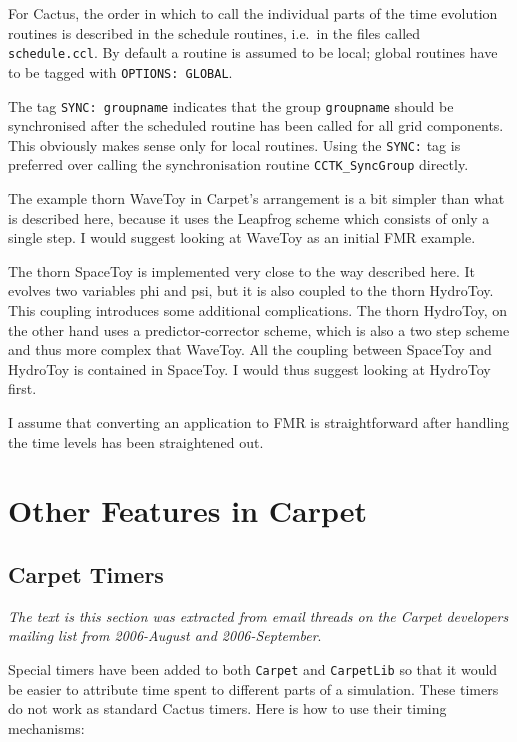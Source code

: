 For Cactus, the order in which to call the individual parts of the
time evolution routines is described in the schedule routines, i.e.\
in the files called \texttt{schedule.ccl}.  By default a routine is
assumed to be local; global routines have to be tagged with
\texttt{OPTIONS: GLOBAL}.

The tag \texttt{SYNC: groupname} indicates that the group
\texttt{groupname} should be synchronised after the scheduled routine
has been called for all grid components.  This obviously makes sense
only for local routines.  Using the \texttt{SYNC:} tag is preferred
over calling the synchronisation routine \texttt{CCTK\_SyncGroup}
directly.

The example thorn WaveToy in Carpet's arrangement is a bit simpler
than what is described here, because it uses the Leapfrog scheme which
consists of only a single step.  I would suggest looking at WaveToy as
an initial FMR example.

The thorn SpaceToy is implemented very close to the way described
here.  It evolves two variables phi and psi, but it is also coupled to
the thorn HydroToy.  This coupling introduces some additional
complications.  The thorn HydroToy, on the other hand uses a
predictor-corrector scheme, which is also a two step scheme and thus
more complex that WaveToy.  All the coupling between SpaceToy and
HydroToy is contained in SpaceToy.  I would thus suggest looking at
HydroToy first.

I assume that converting an application to FMR is straightforward
after handling the time levels has been straightened out.



\section{Other Features in Carpet}

\subsection{Carpet Timers}

{\it The text is this section was extracted from email threads on the
Carpet developers mailing list from 2006-August and 2006-September}.

Special timers have been added to both {\tt Carpet} and {\tt CarpetLib} so
that it would be easier to attribute time spent to different parts of
a simulation.  These timers do not work as standard Cactus timers.
Here is how to use their timing mechanisms:

